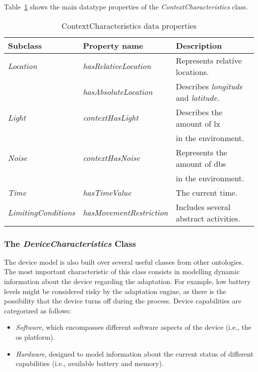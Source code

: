 Table~\ref{tbl:context_characteristics_ontology} shows the main datatype properties
of the \textit{ContextCharacteristics} class.

\begin{table}
  \caption{ContextCharacteristics data properties}
 \label{tbl:context_characteristics_ontology}
\footnotesize
\centering
 \begin{tabular}{l l l}
  \hline 
  \textbf{Subclass} 	& \textbf{Property name} 	& \textbf{Description}		\\
  \hline
  \textit{Location}	& \textit{hasRelativeLocation}	& Represents relative locations.\\
			& \textit{hasAbsoluteLocation}	& Describes \textit{longitude} and \textit{latitude}.\\
  \textit{Light}	& \textit{contextHasLight}	& Describes the amount of \ac{lx}\citep{lux}\\
			& 				& in the environment.		\\
  \textit{Noise}	& \textit{contextHasNoise}	& Represents the amount of \acp{db}\\
			& 				& in the environment.		\\
  \textit{Time}		& \textit{hasTimeValue}		& The current time.		\\
  \textit{LimitingConditions}& \textit{hasMovementRestriction}&	Includes several abstract activities.\\
  \hline
  
\end{tabular}
\end{table}


\subsubsection{The \textit{DeviceCharacteristics} Class}
\label{sec:device_characteristics_class}

The device model is also built over several useful classes from other ontologies.
The most important characteristic of this class consists in modelling dynamic
information about the device regarding the adaptation. For example, low battery
levels might be considered risky by the adaptation engine, as there is the possibility
that the device turns off during the process. Device capabilities are categorized
as follows:

\begin{itemize}
 \item \textit{Software}, which encompasses different software aspects of the
 device (i.e., the \ac{os} platform). 
 
 \item \textit{Hardware}, designed to model information about the current status
 of different capabilities (i.e., available battery and memory).
\end{itemize}


